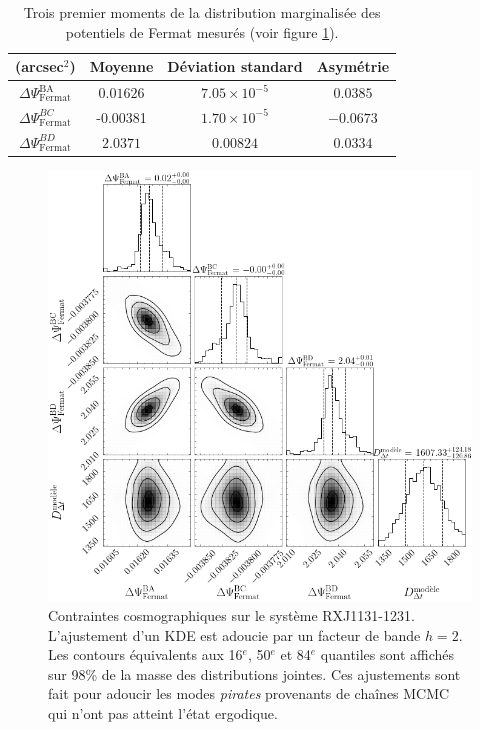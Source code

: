 \documentclass[times,10pt,twocolumn]{article}
\begin{document}
\begin{table}[H]
        \centering
        \begin{tabular}{cccc}
                \toprule
                (arcsec$^{2}$)  &  Moyenne & Déviation standard & Asymétrie \\\midrule
                $\Delta \Psi^{\mathrm{BA}}_{\mathrm{Fermat}}$ 
              & $0.01626$ & $7.05 \times 10^{-5}$  & $0.0385$ \\[1ex]
              $\Delta \Psi^{BC}_{\mathrm{Fermat}}$ 
              & -0.00381 & $1.70 \times 10^{-5}$ & $-0.0673$\\[1ex]
              $\Delta \Psi^{BD}_{\mathrm{Fermat}}$ & $2.0371$ & $0.00824$ & $0.0334$ \\
              \bottomrule
        \end{tabular}
        \caption{Trois premier moments de la distribution marginalisée des potentiels 
        de Fermat mesurés (voir figure \ref{fig:special}).}
        \label{tab:Fermat}
\end{table}

\begin{figure}[H]
        \centering
        \includegraphics[width=\linewidth]{special_corner}
        \caption{Contraintes cosmographiques sur le système RXJ1131-1231. L'ajustement 
        d'un KDE est adoucie par un facteur de bande $h=2$. Les contours équivalents 
aux 16$^{e}$, 50$^{e}$ et 84$^{e}$ quantiles sont affichés sur 98\% de la masse des distributions 
jointes. Ces ajustements sont fait pour adoucir les modes \textit{pirates} provenants 
de chaînes MCMC qui n'ont pas atteint l'état ergodique.}
        \label{fig:special}
\end{figure}
\end{document}
